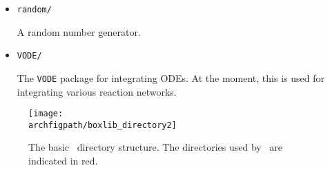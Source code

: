 \begin{itemize}
\begin{itemize}
\begin{itemize}
    \item {\tt random/}

      A random number generator.

    \item {\tt VODE/}

      The {\tt VODE} \cite{vode} package for integrating ODEs.  At the
      moment, this is used for integrating various reaction networks.
 
   \end{itemize}

  \end{itemize}

\end{itemize}


\begin{figure}[t]
\centering
\texttt{[image: \\archfigpath/boxlib\_directory2]}
\caption[\boxlib\ directory structure] {\label{fig:arch:boxlib} The
  basic \boxlib\ directory structure.  The directories used by
  \maestro\ are indicated in red.}
\end{figure}

